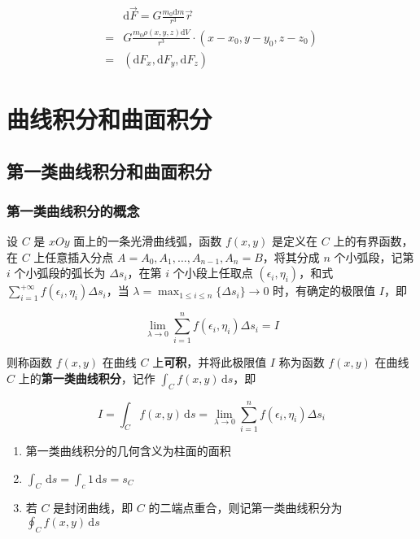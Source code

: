 \documentclass[lang = zh , final , oneside , openany , titlepage , zihao = -4 , linespread = 1.3 , baselineskip = false , cjk-font = windows , text-font = newtx , math-font = newtx , math-style = ISO , uppercase-greek = upright , integral-limits = false]{sjtureport}
\begin{document}
\[\begin{aligned}
  &\mathrm{d}\vec{F} = G\frac{m_0\mathrm{d}m}{r^3}\vec{r}\\
  =& G\frac{m_0\rho(x,y,z)\mathrm{d}V}{r^3}\cdot\left(x-x_0,y-y_0,z-z_0\right)\\
  =&\left(\mathrm{d}F_x,\mathrm{d}F_y,\mathrm{d}F_z\right)
\end{aligned}\]

\chapter{曲线积分和曲面积分}

\section{第一类曲线积分和曲面积分}

\subsection{第一类曲线积分的概念}

\begin{definition}
    设 \(C\) 是 \(xOy\) 面上的一条光滑曲线弧，函数 \(f(x,y)\) 是定义在 \(C\)
上的有界函数，在 \(C\) 上任意插入分点
\(A = A_0,A_1,\ldots,A_{n-1},A_n=B\)，将其分成 \(n\) 个小弧段，记第
\(i\) 个小弧段的弧长为 \(\Delta s_i\)，在第 \(i\) 个小段上任取点
\((\epsilon_i,\eta_i)\)，和式
\(\displaystyle\sum_{i=1}^{+\infty}f(\epsilon_i,\eta_i)\Delta s_i\)，当
\(\displaystyle\lambda=\max_{1\leq i\leq n}\{\Delta s_i\}\to 0\)
时，有确定的极限值 \(I\)，即

\[\lim_{\lambda\to 0}\sum_{i=1}^nf(\epsilon_i,\eta_i)\Delta s_i = I\]

则称函数 \(f(x,y)\) 在曲线 \(C\) 上\textbf{可积}，并将此极限值 \(I\)
称为函数 \(f(x,y)\) 在曲线 \(C\) 上的\textbf{第一类曲线积分}，记作
\(\displaystyle\int_Cf(x,y)\,\mathrm{d}s\)，即

\[I = \int_C f(x,y)\,\mathrm{d}s = \lim_{\lambda\to 0}\sum_{i=1}^nf(\epsilon_i,\eta_i)\Delta s_i\]
\end{definition}

\begin{enumerate}
\item
  第一类曲线积分的几何含义为柱面的面积
\item
  \(\displaystyle\int_C\,\mathrm{d}s = \displaystyle\int_c1\,\mathrm{d}s=s_C\)
\item
  若 \(C\) 是封闭曲线，即 \(C\) 的二端点重合，则记第一类曲线积分为
  \(\displaystyle\oint_Cf(x,y)\,\mathrm{d}s\)
\end{enumerate}
\end{document}
